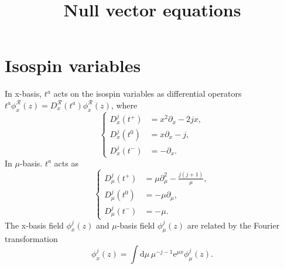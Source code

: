 \documentclass[10pt,a4paper]{article}
\theoremstyle{definition}
\theoremstyle{plain}
\theoremstyle{remark}
\numberwithin{equation}{section}
\begin{document}
\title{Null vector equations}
\maketitle
\tableofcontents


\section{Isospin variables}
In x-basis, $t^{a}$ acts on the isospin variables as differential operators 
$t^{a} \phi^{\mathcal{R}}_{x}(z) = D^{\mathcal{R}}_{x} (t^{a}) \phi^{\mathcal{R}}_{x}(z)$, where 
\begin{equation}
    \left\{
        \begin{aligned}
            D^{j}_{x}(t^{+}) &= x^{2} \partial_{x} - 2 j x, \\
            D^{j}_{x}(t^{0}) &= x \partial_{x} - j, \\
            D^{j}_{x}(t^{-}) &= - \partial_{x}.
        \end{aligned}
    \right. \label{Diffx}
\end{equation}
In $\mu$-basis. $t^{a}$ acts as 
\begin{equation}
    \left\{
        \begin{aligned}
            D^{j}_{\mu}(t^{+}) &= \mu \partial_{\mu}^{2} - \frac{j(j+1)}{\mu}, \\
            D^{j}_{\mu}(t^{0}) &= - \mu \partial_{\mu}, \\
            D^{j}_{\mu}(t^{-}) &= - \mu.
        \end{aligned}
    \right. \label{Diffmu}
\end{equation}
The x-basis field $\phi^{j}_{x}(z)$ and $\mu$-basis field $\phi^{j}_{\mu}(z)$ are related by the Fourier transformation 
\begin{equation}
    \phi^{j}_{x}(z) = \int \mathrm{d} \mu \, \mu^{-j-1} \mathrm{e}^{\mu x} \phi^{j}_{\mu}(z).
\end{equation}
\end{document}
